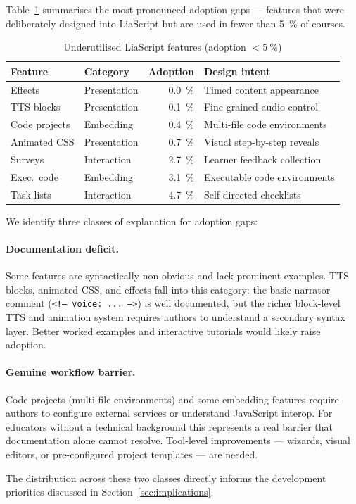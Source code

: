 
Table~\ref{tab:gaps} summarises the most pronounced adoption gaps ---
features that were deliberately designed into LiaScript but are used
in fewer than \SI{5}{\percent} of courses.

\begin{table}[ht]
  \centering
  \caption{Underutilised LiaScript features (adoption $< \SI{5}{\percent}$)}
  \label{tab:gaps}
  \begin{tabular}{llrp{4.2cm}}
    \toprule
    \textbf{Feature} & \textbf{Category} & \textbf{Adoption} & \textbf{Design intent} \\
    \midrule
    Effects            & Presentation  & \SI{0.0}{\percent}  & Timed content appearance \\
    TTS blocks         & Presentation  & \SI{0.1}{\percent}  & Fine-grained audio control \\
    Code projects      & Embedding     & \SI{0.4}{\percent}  & Multi-file code environments \\
    Animated CSS       & Presentation  & \SI{0.7}{\percent}  & Visual step-by-step reveals \\
    Surveys            & Interaction   & \SI{2.7}{\percent}  & Learner feedback collection \\
    Exec.\ code        & Embedding     & \SI{3.1}{\percent}  & Executable code environments \\
    Task lists         & Interaction   & \SI{4.7}{\percent}  & Self-directed checklists \\
    \bottomrule
  \end{tabular}
\end{table}

We identify three classes of explanation for adoption gaps:

\paragraph{Documentation deficit.}
Some features are syntactically non-obvious and lack prominent examples.
TTS blocks, animated CSS, and effects fall into this category:
the basic narrator comment (\texttt{<!-- voice: ... -->}) is well documented,
but the richer block-level TTS and animation system requires authors to
understand a secondary syntax layer.
Better worked examples and interactive tutorials would likely raise adoption.

\paragraph{Genuine workflow barrier.}
Code projects (multi-file environments) and some embedding features require
authors to configure external services or understand JavaScript interop.
For educators without a technical background this represents a real barrier
that documentation alone cannot resolve.
Tool-level improvements --- wizards, visual editors, or pre-configured
project templates --- are needed.

The distribution across these two classes directly informs the
development priorities discussed in Section~\ref{sec:implications}.
